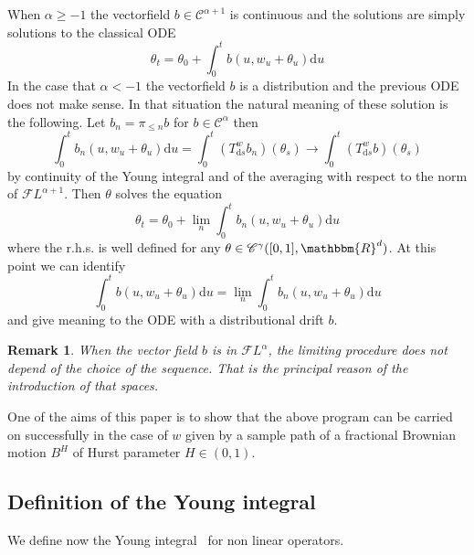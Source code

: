 \documentclass[a4paper,11pt]{article}
\newcommand{\mathd}{\mathrm{d}}
\newtheorem{remark}[theorem]{Remark}
\newcommand{\CC}{\mathscr C}
\newcommand{\CF}{\mathscr F}
\begin{document}
When $\alpha \geqslant -1$ the vectorfield $b \in \CC^{\alpha +1}$ is
continuous and the solutions are simply solutions to the classical ODE
\[ \theta_{t} = \theta_{0} + \int_{0}^{t} b (u,w_{u} + \theta_{u} ) \mathd u
\]
In the case that $\alpha <-1$ the vectorfield $b$ is a distribution and the
previous ODE does not make sense. In that situation the natural meaning of
these solution is the following. Let $b_{n} = \pi_{\leqslant n} b$ for $b \in
\CC^{\alpha}$ then
\[ \int_{0}^{t} b_{n}  (u,w_{u} + \theta_{u} ) \mathd u= \int_{0}^{t}
   (T^{w}_{\mathd s} b_{n} ) ( \theta_{s} ) \to \int_{0}^{t} (T^{w}_{\mathd s}
   b) ( \theta_{s} ) \]
by continuity of the Young integral and of the averaging with respect to the
norm of $\CF L^{\alpha +1}$. Then $\theta$ solves the equation
\[ \theta_{t} = \theta_{0} + \lim_{n}   \int_{0}^{t} b_{n}  (u,w_{u} +
   \theta_{u} ) \mathd u \]
where the r.h.s. is well defined for any $\theta \in \CC^{\gamma}
([0,1],\mathbbm{R}^{d} )$. At this point we can identify
\[ \int_{0}^{t} b (u,w_{u} + \theta_{u} ) \mathd u= \lim_{n}   \int_{0}^{t}
   b_{n}  (u,w_{u} + \theta_{u} ) \mathd u \]
and give meaning to the ODE with a distributional drift $b$.

\begin{remark}
  When the vector field $b$ is in $\CF L^{\alpha}$, the limiting procedure
  does not depend of the choice of the sequence. That is the principal reason
  of the introduction of that spaces.
\end{remark}

One of the aims of this paper is to show that the above program can be carried
on successfully in the case of $w$ given by a sample path of a fractional
Brownian motion $B^{H}$ of Hurst parameter $H \in (0,1)$.

\subsection{Definition of the Young integral}

We define now the Young integral~{\cite{Young,Lyons,controlling}} for non
linear operators.
\end{document}

